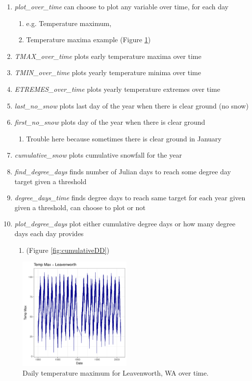 \documentclass[12pt,letter]{article}
\begin{document}
\begin{enumerate}
   \item \textit{plot\_over\_time} can choose to plot any variable over time, for each day 
      \begin{enumerate}
     \item e.g. Temperature maximum, 
     \item Temperature maxima example (Figure \ref{fig:LTempMax})
   \end{enumerate}
   \item \textit{TMAX\_over\_time} plots early temperature maxima over time
   \item \textit{TMIN\_over\_time} plots yearly temperature minima over time
   \item \textit{ETREMES\_over\_time} plots yearly temperature extremes over time
   \item \textit{last\_no\_snow} plots last day of the year when there is clear ground (no snow)
   \item \textit{first\_no\_snow} plots day of the year when there is clear ground
        \begin{enumerate}
     	\item Trouble here because sometimes there is clear ground in January
   	\end{enumerate}
   \item \textit{cumulative\_snow} plots cumulative snowfall for the year
   \item \textit{find\_degree\_days} finds number of Julian days to reach some degree day target given a threshold
   \item \textit{degree\_days\_time} finds degree days to reach same target for each year given given a threshold, can choose to plot or not
   \item \textit{plot\_degree\_days} plot either cumulative degree days or how many degree days each day provides 
           \begin{enumerate}
     	\item (Figure \ref{fig:cumulativeDD})
   	\end{enumerate}
 \end{enumerate}


\begin{figure}
\centering
\includegraphics[width = 0.5\textwidth]{../Plots/TMAX_Leavenworth_KD.pdf}
\caption{Daily temperature maximum for Leavenworth, WA over time.}
\label{fig:LTempMax}
\end{figure}
\end{document}
